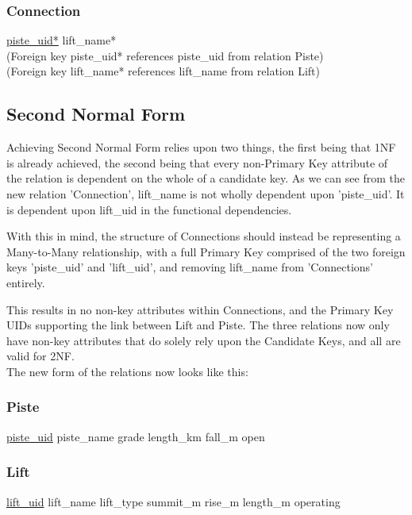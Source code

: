 \documentclass[11pt]{scrartcl} %
\begin{document}
\subsubsection{Connection}
\underline{piste\_uid*}\newline
lift\_name*\\[0.3cm]
(Foreign key piste\_uid* references piste\_uid from relation Piste)\\
(Foreign key lift\_name* references lift\_name from relation Lift)

\subsection{Second Normal Form}
Achieving Second Normal Form relies upon two things, the first being that 1NF is already achieved, the second being that every non-Primary Key attribute of the relation is dependent on the whole of a candidate key. As we can see from the new relation 'Connection', lift\_name is not wholly dependent upon 'piste\_uid'. It is dependent upon lift\_uid in the functional dependencies.

With this in mind, the structure of Connections should instead be representing a Many-to-Many relationship, with a full Primary Key comprised of the two foreign keys 'piste\_uid' and 'lift\_uid', and removing lift\_name from 'Connections' entirely.

This results in no non-key attributes within Connections, and the Primary Key UIDs supporting the link between Lift and Piste. The three relations now only have non-key attributes that do solely rely upon the Candidate Keys, and all are valid for 2NF.\\[0.3cm]
The new form of the relations now looks like this:

\subsubsection{Piste}
\underline{piste\_uid}\newline
piste\_name\newline
grade\newline
length\_km\newline
fall\_m\newline
open

\subsubsection{Lift}
\underline{lift\_uid}\newline
lift\_name\newline
lift\_type\newline
summit\_m\newline
rise\_m\newline
length\_m\newline
operating
\end{document}
